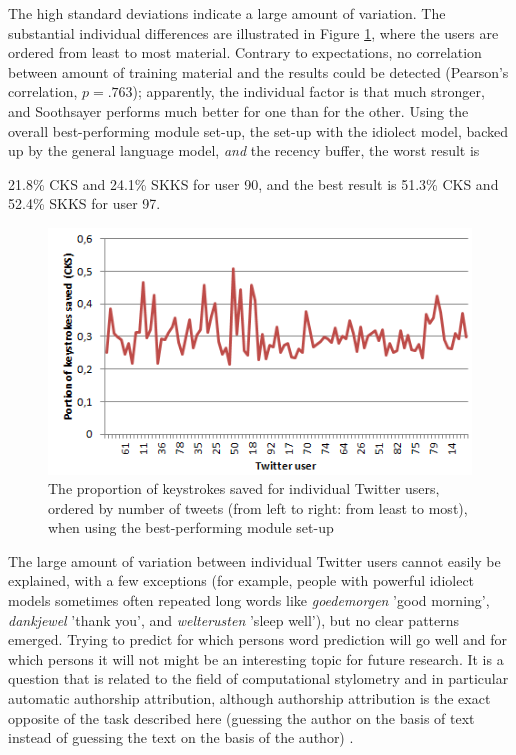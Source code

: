 \documentclass[12pt]{article}
\begin{document}
The high standard deviations indicate a large amount of variation. The substantial individual differences are illustrated in Figure \ref{chaos}, where the users are ordered from least to most material. Contrary to expectations, no correlation between amount of training material and the results could be detected (Pearson's correlation, $p = .763$); apparently, the individual factor is that much stronger, and Soothsayer performs much better for one than for the other. Using the overall best-performing module set-up, the set-up with the idiolect model, backed up by the general language model, \emph{and} the recency buffer, the worst result is {21.8\% CKS and 24.1\% SKKS for user 90, and the best result is 51.3\% CKS and 52.4\% SKKS for user 97.

\begin{figure}[htb] \centering
\includegraphics[scale=1.0]{twitter_chaos}
\caption{The proportion of keystrokes saved for individual Twitter users, ordered by number of tweets (from left to right: from least to most), when using the best-performing module set-up}
\label{chaos}
\end{figure} 


The large amount of variation between individual Twitter users cannot easily be explained, with a few exceptions (for example, people with powerful idiolect models sometimes often repeated long words like \emph{goedemorgen} 'good morning', \emph{dankjewel} 'thank you', and \emph{welterusten} 'sleep well'), but no clear patterns emerged. Trying to predict for which persons word prediction will go well and for which persons it will not might be an interesting topic for future research. It is a question that is related to the field of computational stylometry and in particular automatic authorship attribution, although authorship attribution is the exact opposite of the task described here (guessing the author on the basis of text instead of guessing the text on the basis of the author) \cite{bagavandas+08}.

}
\end{document}
